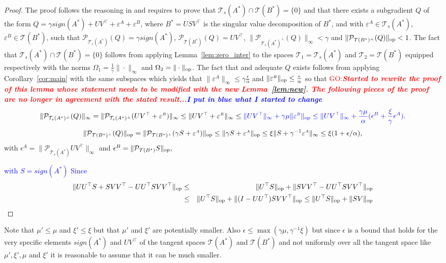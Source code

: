 \documentclass{article}
\def\T{\mathcal{T}}
\def\op{{\rm op}}
\newcommand\ve[1]{\varepsilon^{{\scriptscriptstyle#1}}}
\newcommand{\tred}[1]{\textcolor{red}{#1}}
\newcommand{\tblue}[1]{\textcolor{blue}{#1}}
\newcommand{\GO}[1]{\tred{GO:\textbf{\emph{#1}}}}
\begin{document}
\begin{proof}
The proof follows the reasoning in \citet{chandrasekaran2011rank} and requires to prove that $\T_s(A^*)\cap \T(B^*)=\{0\}$ and that there exists a subgradient $Q$ of the form $Q=\gamma sign(A^*)+UV^\top+\ve{A}+\ve{B}$, where $B^*=USV^\top$
is the singular value decomposition of $B^*$, and with $\ve{A} \in \T_s(A^*)$,  $\ve{B} \in \T(B^*)$,
such that $\mathcal{P}_{\T_s(A^*)}(Q)=\gamma sign(A^*)$, $\mathcal{P}_{\T(B^*)}(Q)=UV^\top$, $\|\mathcal{P}_{\T_s(A^*)^\bot}(Q)\|_{\infty} <\gamma$ and  $\|\mathcal{P}_{\T(B^*)^\bot}(Q)\|_{\op} <1$. The fact that $\T_s(A^*)\cap \T(B^*)=\{0\}$ follows from applying Lemma~\ref{lem:zero_inter} to the spaces $\T_1=\T_s(A^*)$ and $\T_2=\T(B^*)$ equipped respectively with the norms $\Omega_1=\frac{1}{\gamma}\|\cdot\|_{\infty}$ and $\Omega_2=\|\cdot\|_{\op}$. The fact that and adequate $Q$ exists follows from applying Corollary~\ref{cor:main} with the same subspaces which yields that
$\|\ve{A}\|_{\infty} \leq \gamma \frac{\epsilon}{\alpha}$ and $\|\ve{B}\|_{\op} \leq \frac{\epsilon}{\alpha}$ so that 
\GO{Started to rewrite the proof of this lemma whose statement needs to be modified with the new Lemma~\ref{lem:new}. The following pieces of the proof are no longer in agreement with the stated result...\tblue{I put in blue what I started to change}}
$$\|\mathcal{P}_{\T_s(A^*)^\bot}(Q)\|_{\infty}=\|\mathcal{P}_{\T_s(A^*)^\bot}(UV^\top+\ve{B})\|_{\infty}\leq \|UV^\top+\ve{B}\|_{\infty} \leq \tblue{\|UV^\top\|_{\infty}+\gamma \mu \|\ve{B}\|_{\op} \leq \|UV^\top\|_{\infty}+\frac{\gamma \mu}{\alpha}(\epsilon^B+\frac{\xi}{\gamma} \epsilon^A).}$$
$$\|\mathcal{P}_{\T(B^*)^\bot}(Q)\|_{\op}=\|\mathcal{P}_{\T(B^*)^\bot}(\gamma S+\ve{A})\|_{\op}\leq \|\gamma S+\ve{A}\|_{\op} \leq \xi \|S+\gamma^{-1}\ve{A}\|_{\infty} \leq  \xi (1+\epsilon/\alpha),$$
with $\epsilon^A=\|\mathcal{P}_{\T_s(A^*)}UV^\top\|_{\infty}$ and 
$\epsilon^B=\|\mathcal{P}_{\T(B^*)}S\|_{\op},$

\tblue{with $S=sign(A^*)$
Since 
\begin{eqnarray*}
\|UU^\top S+S VV^\top-UU^\top S VV^\top\|_{\op} &\leq & \|U^\top  S\|_{\op}+\|S VV^\top-UU^\top S VV^\top\|_{\op}\\
&\leq & \|U^\top S\|_{\op}+\|(I-UU^\top)S VV^\top\|_{\op} \leq \|U^\top S\|_{\op}+\| SV\|_{\op}
\end{eqnarray*}}
\end{proof}

Note that $\mu'\leq \mu$ and $\xi'\leq \xi$ but that $\mu'$ and $\xi'$ are potentially smaller. Also $\epsilon \leq \max(\gamma \mu, \gamma^{-1}\xi)$ but since $\epsilon$ is a bound that holds for the very specific elements $sign(A^*)$ and $UV^\top$ of the tangent spaces $\T(A^*)$ and $\T(B^*)$ and not uniformly over all the tangent space like $\mu', \xi',\mu$ and $\xi'$ it is reasonable to assume that it can be much smaller. 
\end{document}
